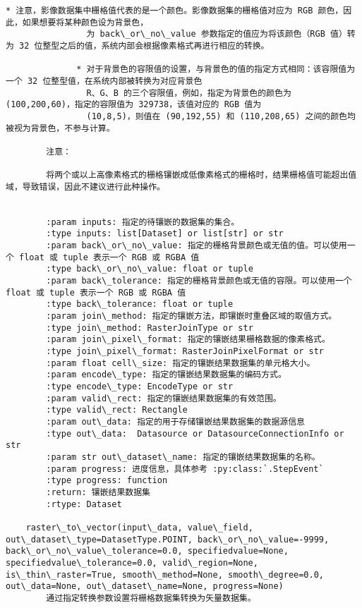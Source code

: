 \documentclass[11pt]{article}
\begin{document}
\begin{Verbatim}[commandchars=\\\{\}]
              * 注意，影像数据集中栅格值代表的是一个颜色。影像数据集的栅格值对应为 RGB 颜色，因此，如果想要将某种颜色设为背景色，
                为 back\_or\_no\_value 参数指定的值应为将该颜色（RGB 值）转为 32 位整型之后的值，系统内部会根据像素格式再进行相应的转换。
        
              * 对于背景色的容限值的设置，与背景色的值的指定方式相同：该容限值为一个 32 位整型值，在系统内部被转换为对应背景色
                R、G、B 的三个容限值，例如，指定为背景色的颜色为 (100,200,60)，指定的容限值为 329738，该值对应的 RGB 值为
                (10,8,5)，则值在 (90,192,55) 和 (110,208,65) 之间的颜色均被视为背景色，不参与计算。
        
        注意：
        
        将两个或以上高像素格式的栅格镶嵌成低像素格式的栅格时，结果栅格值可能超出值域，导致错误，因此不建议进行此种操作。
        
        
        :param inputs: 指定的待镶嵌的数据集的集合。
        :type inputs: list[Dataset] or list[str] or str
        :param back\_or\_no\_value: 指定的栅格背景颜色或无值的值。可以使用一个 float 或 tuple 表示一个 RGB 或 RGBA 值
        :type back\_or\_no\_value: float or tuple
        :param back\_tolerance: 指定的栅格背景颜色或无值的容限。可以使用一个 float 或 tuple 表示一个 RGB 或 RGBA 值
        :type back\_tolerance: float or tuple
        :param join\_method: 指定的镶嵌方法，即镶嵌时重叠区域的取值方式。
        :type join\_method: RasterJoinType or str
        :param join\_pixel\_format: 指定的镶嵌结果栅格数据的像素格式。
        :type join\_pixel\_format: RasterJoinPixelFormat or str
        :param float cell\_size: 指定的镶嵌结果数据集的单元格大小。
        :param encode\_type: 指定的镶嵌结果数据集的编码方式。
        :type encode\_type: EncodeType or str
        :param valid\_rect: 指定的镶嵌结果数据集的有效范围。
        :type valid\_rect: Rectangle
        :param out\_data: 指定的用于存储镶嵌结果数据集的数据源信息
        :type out\_data:  Datasource or DatasourceConnectionInfo or str
        :param str out\_dataset\_name: 指定的镶嵌结果数据集的名称。
        :param progress: 进度信息，具体参考 :py:class:`.StepEvent`
        :type progress: function
        :return: 镶嵌结果数据集
        :rtype: Dataset
    
    raster\_to\_vector(input\_data, value\_field, out\_dataset\_type=DatasetType.POINT, back\_or\_no\_value=-9999, back\_or\_no\_value\_tolerance=0.0, specifiedvalue=None, specifiedvalue\_tolerance=0.0, valid\_region=None, is\_thin\_raster=True, smooth\_method=None, smooth\_degree=0.0, out\_data=None, out\_dataset\_name=None, progress=None)
        通过指定转换参数设置将栅格数据集转换为矢量数据集。
        

\end{Verbatim}
\end{document}
